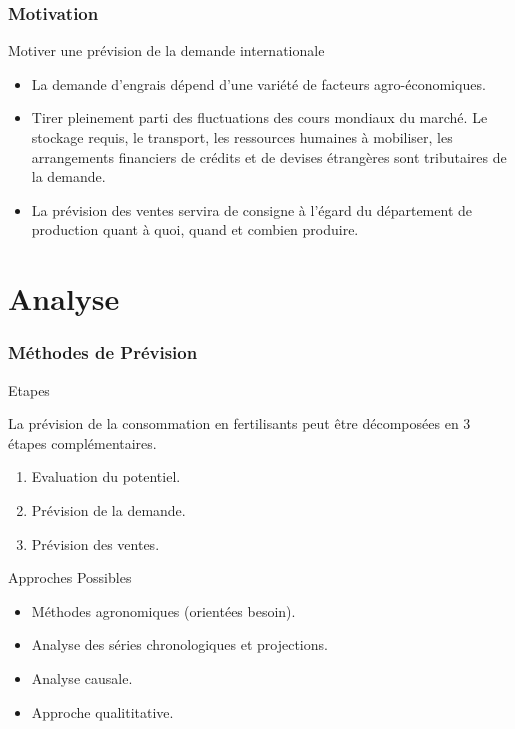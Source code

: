 \documentclass{beamer}
\begin{document}
\begin{frame}
  \frametitle{Motivation}
  \begin{block}{Motiver une prévision de la demande internationale}
    \begin{itemize}
    \item La demande d'engrais dépend d'une variété de facteurs agro-économiques.
    \item Tirer pleinement parti des fluctuations des cours mondiaux du marché. Le stockage requis, le transport, les ressources humaines à mobiliser, les arrangements financiers de crédits et de devises étrangères sont tributaires de la demande.
    \item  La prévision des ventes servira de consigne à l’égard du département de production quant à quoi, quand et combien produire.
    \end{itemize}
    \end{block}
\end{frame}

\section{Analyse}

\begin{frame}
  \frametitle{Méthodes de Prévision}
  \begin{block}{Etapes}
  \small{La prévision de la consommation en fertilisants peut être décomposées en 3 étapes complémentaires.
  \begin{enumerate}
  \item Evaluation du potentiel.
  \item Prévision de la demande.
  \item Prévision des ventes.
  \end{enumerate}
  }\end{block}

	\begin{block}{Approches Possibles}
	\small{
	\begin{itemize}
	\item Méthodes agronomiques (orientées besoin).
	\item Analyse des séries chronologiques et projections.
	\item Analyse causale.
	\item Approche qualititative.
	\end{itemize}
	}
	\end{block}
\end{frame}
\end{document}
